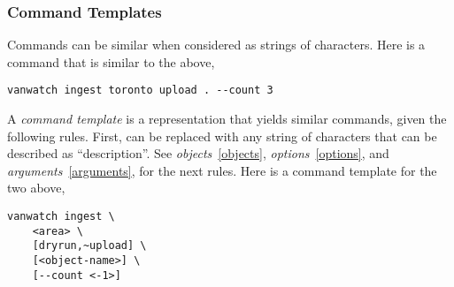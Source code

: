 \subsubsection{Command Templates}
\label{command-template}

Commands can be similar when considered as strings of characters. Here is a command that is similar to the above,
%
\begin{verbatim}
vanwatch ingest toronto upload . --count 3
\end{verbatim}
%
A \emph{command template} is a representation that yields similar commands, given the following rules. First,  can be replaced with any string of characters that can be described as ``description''. See \emph{objects}~\ref{objects}, \emph{options}~\ref{options}, and \emph{arguments}~\ref{arguments}, for the next rules. Here is a command template for the two above,
%
\begin{verbatim}
vanwatch ingest \
    <area> \
    [dryrun,~upload] \
    [<object-name>] \
    [--count <-1>]
\end{verbatim}